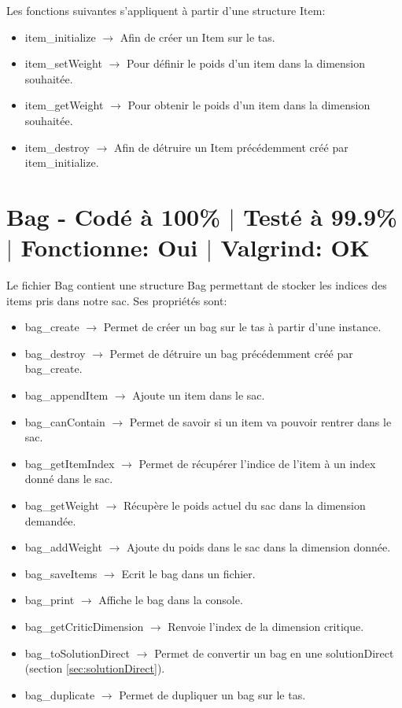 \documentclass{EPUProjetPeiP}
\newcommand{\comp}[5]{
	\section[#1]{#1 {\small - Codé à #2\% $\vert$ Testé à #3\% $\vert$ Fonctionne: #4 $\vert$ Valgrind: #5}}
}
\begin{document}
Les fonctions suivantes s'appliquent à partir d'une structure Item:
\begin{itemize}
	\item item\_initialize $\longrightarrow$ Afin de créer un Item sur le tas.
	\item item\_setWeight $\longrightarrow$ Pour définir le poids d'un item dans la dimension souhaitée.
	\item item\_getWeight $\longrightarrow$ Pour obtenir le poids d'un item dans la dimension souhaitée.
	\item item\_destroy $\longrightarrow$ Afin de détruire un Item précédemment créé par item\_initialize.
\end{itemize}

\comp{Bag}{100}{99.9}{Oui}{OK}
Le fichier Bag contient une structure Bag permettant de stocker les indices des items pris dans notre sac. Ses propriétés sont:
\begin{itemize}
	\item bag\_create $\longrightarrow$ Permet de créer un bag sur le tas à partir d'une instance.
	\item bag\_destroy $\longrightarrow$ Permet de détruire un bag précédemment créé par bag\_create.
	\item bag\_appendItem $\longrightarrow$ Ajoute un item dans le sac.
	\item bag\_canContain $\longrightarrow$ Permet de savoir si un item va pouvoir rentrer dans le sac.
	\item bag\_getItemIndex $\longrightarrow$ Permet de récupérer l'indice de l'item à un index donné dans le sac.
	\item bag\_getWeight $\longrightarrow$ Récupère le poids actuel du sac dans la dimension demandée.
	\item bag\_addWeight $\longrightarrow$ Ajoute du poids dans le sac dans la dimension donnée.
	\item bag\_saveItems $\longrightarrow$ Ecrit le bag dans  un fichier.
	\item bag\_print $\longrightarrow$ Affiche le bag dans la console.
	\item bag\_getCriticDimension $\longrightarrow$ Renvoie l'index de la dimension critique.
	\item bag\_toSolutionDirect $\longrightarrow$ Permet de convertir un bag en une solutionDirect (section \ref{sec:solutionDirect}).
	\item bag\_duplicate $\longrightarrow$ Permet de dupliquer un bag sur le tas.
\end{itemize}
\end{document}
